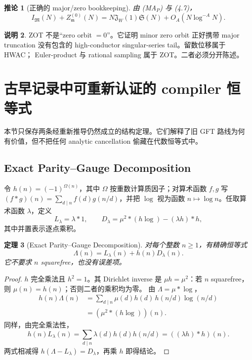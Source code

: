 \documentclass[11pt,a4paper]{ctexart}
\newtheorem{theorem}{定理}[section]
\newtheorem{corollary}[theorem]{推论}
\theoremstyle{definition}
\newtheorem{remark}[theorem]{说明}
\newcommand{\1}{\mathbf 1}
\begin{document}
\begin{corollary}[正确的 major/zero bookkeeping]
由 \textup{(MA$_P$)} 与 (4.7)，
\[
I_{\mathfrak M}(N)+Z_{\mathfrak m}^{(0)}(N)
=N\mathfrak J_W(1)\mathfrak S(N)+O_A(N\log^{-A}N).     \tag{4.11}
\]
\end{corollary}

\begin{remark}
ZOT 不是“zero orbit $=0$”。它证明 minor zero orbit 正好携带 major truncation
没有包含的 high-conductor singular-series tail。留数位移属于 HWAC；
Euler-product 与 rational sampling 属于 ZOT。二者必须分开陈述。
\end{remark}

\section{古早记录中可重新认证的 compiler 恒等式}

本节只保存两条经重新推导仍然成立的结构定理。它们解释了旧 GFT 路线为何
有价值，但不把任何 analytic cancellation 偷藏在代数恒等式中。

\subsection{Exact Parity--Gauge Decomposition}

令 $h(n)=(-1)^{\Omega(n)}$，其中 $\Omega$ 按重数计算质因子；对算术函数
$f,g$ 写 $(f*g)(n)=\sum_{d\mid n}f(d)g(n/d)$，并把 $\log$ 视为函数
$n\mapsto\log n$。任取算术函数 $\lambda$，定义
\[
L_\lambda=\lambda*1,
\qquad
D_\lambda=\mu^2*(h\log)-(\lambda h)*h,               \tag{EPG.1}
\]
其中并置表示逐点乘积。

\begin{theorem}[Exact Parity--Gauge Decomposition]\label{thm:epg-main}
对每个整数 $n\ge1$，有精确恒等式
\[
\boxed{\Lambda(n)=L_\lambda(n)+h(n)D_\lambda(n).}     \tag{EPG}
\]
它不要求 $n$ squarefree，也没有误差项。
\end{theorem}

\begin{proof}
$h$ 完全乘法且 $h^2=1$。其 Dirichlet inverse 是
$\mu h=\mu^2$：若 $n$ squarefree，则 $\mu(n)=h(n)$；否则二者的乘积均为零。
由 $\Lambda=\mu*\log$，
\[
\begin{aligned}
h(n)\Lambda(n)
&=\sum_{d\mid n}\mu(d)h(d)\,h(n/d)\log(n/d)\\
&=(\mu^2*(h\log))(n).
\end{aligned}
\]
同样，由完全乘法性，
\[
h(n)L_\lambda(n)
=\sum_{d\mid n}\lambda(d)h(d)h(n/d)
=((\lambda h)*h)(n).
\]
两式相减得 $h(\Lambda-L_\lambda)=D_\lambda$，再乘 $h$ 即得结论。
\end{proof}
\end{document}
